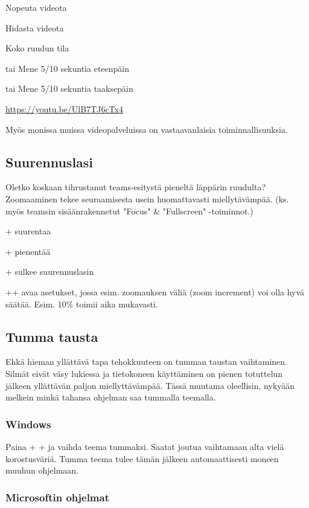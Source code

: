 \documentclass[a4paper,12pt]{scrartcl}
\begin{document}
 Nopeuta videota

\keys{\shift + ,} Hidasta videota

 Koko ruudun tila

\keys{\keys{\arrowkeyright}} tai  Mene 5/10 sekuntia eteenpäin

\keys{\keys{\arrowkeyleft}} tai  Mene 5/10 sekuntia taaksepäin

\url{https://youtu.be/UlB7TJ6cTx4}

\medskip

Myös monissa muissa videopalveluissa on vastaavanlaisia toiminnallisuuksia.

\subsection{Suurennuslasi}

Oletko koskaan tihrustanut teams-esitystä pieneltä läppärin ruudulta? Zoomaaminen tekee seuraamisesta usein huomattavasti miellytävämpää. (ks. myös teamsin sisäänrakennetut "Focus" \& "Fullscreen" -toiminnot.)

 + \menu{+} suurentaa

+\keys{-} pienentää

+ sulkee suurennuslasin

+\keys{\shift}+ avaa asetukset, jossa esim. zoomauksen väliä (zoom increment) voi olla hyvä säätää. Esim. 10\% toimii aika mukavasti.

\subsection{Tumma tausta}

Ehkä hieman yllättävä tapa tehokkuuteen on tumman taustan vaihtaminen. Silmät eivät väsy lukiessa ja tietokoneen käyttäminen on pienen totuttelun jälkeen yllättävän paljon miellyttävämpää. Tässä muutama oleellisin, nykyään melkein minkä tahansa ohjelman saa tummalla teemalla.

\subsubsection{Windows}
Paina  +  + \keys{\return} ja vaihda teema tummaksi. Saatat joutua vaihtamaan alta vielä korostusväriä. Tumma teema tulee tämän jälkeen automaattisesti moneen muuhun ohjelmaan.

\subsubsection{Microsoftin ohjelmat}
\end{document}
